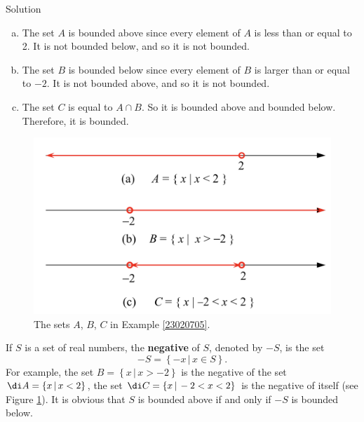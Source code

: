 \begin{solution}{Solution}
\begin{enumerate}[(a)]
\item
The set $A$ is bounded above since every element of $A$ is less than or equal to 2. It is not bounded below, and so it is not bounded.

\item The set $B$ is bounded below since every element of $B$ is larger than or equal to $-2$. It is not bounded above, and so it is not bounded.


\item The set $C$ is equal to $A\cap B$. So it is bounded above and bounded below. Therefore, it is bounded.
\end{enumerate}
\end{solution}

\begin{figure}[ht]
\centering
\includegraphics[scale=0.2]{Picture5.png}

\caption{  The sets $A$, $B$, $C$ in Example \ref{23020705}.}\label{figure5}
\end{figure}

If $S$ is a set of real numbers, the {\bf negative} of $S$, denoted by $-S$, is the set
\[-S=\left\{-x\,|\,x\in S\right\}.\]
For example, the set $B=\left\{x\,|\, x>-2\right\}$ is the negative of the set $\di A=\left\{x\,|\, x<2\right\}$, the set $\di C=\left\{x\,|\, -2<x<2\right\}$ is the negative of itself (see Figure \ref{figure5}). It is obvious that $S$ is bounded above if and only if $-S$ is bounded below.


